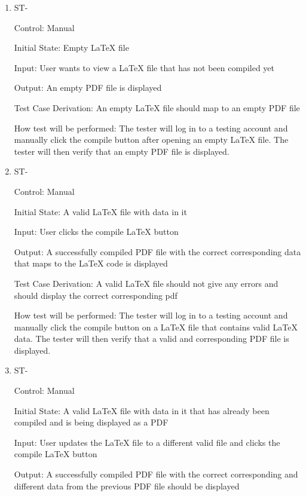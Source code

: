 \documentclass[12pt, titlepage]{article}
\newcounter{TESTID}
\newcommand\TESTNUM{\stepcounter{TESTID}\theTESTID}
\begin{document}
	\begin{enumerate}
		
		\item{ST-\TESTNUM\\}
		
		Control: Manual
		
		Initial State: Empty LaTeX file
		
		Input: User wants to view a LaTeX file that has not been compiled yet
		
		Output: An empty PDF file is displayed
		
		Test Case Derivation: An empty LaTeX file should map to an empty PDF file
		
		How test will be performed: The tester will log in to a testing account and manually click the compile button after opening an empty LaTeX file. The tester will then verify that an empty PDF file is displayed.
		
		\item{ST-\TESTNUM\\}
		
		Control: Manual
		
		Initial State: A valid LaTeX file with data in it
		
		Input: User clicks the compile LaTeX button
		
		Output: A successfully compiled PDF file with the correct corresponding data that maps to the LaTeX code is displayed
		
		Test Case Derivation: A valid LaTeX file should not give any errors and should display the correct corresponding pdf
		
		How test will be performed: The tester will log in to a testing account and manually click the compile button on a LaTeX file that contains valid LaTeX data. The tester will then verify that a valid and corresponding PDF file is displayed.
		
		\item{ST-\TESTNUM\\}
		
		Control: Manual
		
		Initial State: A valid LaTeX file with data in it that has already been compiled and is being displayed as a PDF
		
		Input: User updates the LaTeX file to a different valid file and clicks the compile LaTeX button
		
		Output: A successfully compiled PDF file with the correct corresponding and different data from the previous PDF file should be displayed
		

\end{enumerate}
\end{document}

